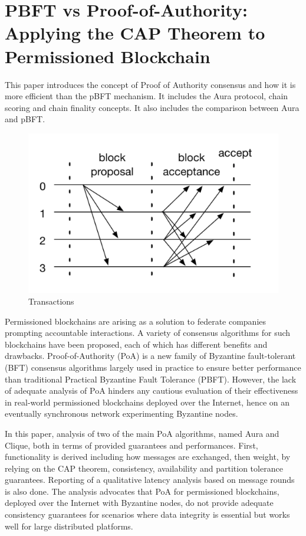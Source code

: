 \section { \textbf{PBFT vs Proof-of-Authority: Applying the CAP Theorem to Permissioned Blockchain}}
	      	      
	      This paper introduces the concept of Proof of Authority consensus and how it is more efficient than the pBFT mechanism. It includes the Aura protocol, chain scoring and chain finality concepts. It also includes the comparison between Aura and pBFT.
	\begin{figure}[!h]
	\centering
	\includegraphics[width=\linewidth]{Images/aura.png}
	\caption{Transactions}
\end{figure}	      	      
	      Permissioned blockchains are arising as a solution to federate companies prompting accountable interactions. A variety of consensus algorithms for such blockchains have been proposed, each of which has different benefits and drawbacks. Proof-of-Authority (PoA) is a new family of Byzantine fault-tolerant (BFT) consensus algorithms largely used in practice to ensure better performance than traditional Practical Byzantine Fault Tolerance (PBFT). However, the lack of adequate analysis of PoA hinders any cautious evaluation of their effectiveness in real-world permissioned blockchains deployed over the Internet, hence on an eventually synchronous network experimenting Byzantine nodes. 
	      
	      In this paper, analysis of two of the main PoA algorithms, named Aura and Clique, both in terms of provided guarantees and performances. First, functionality is derived including how messages are exchanged, then weight, by relying on the CAP theorem, consistency, availability and partition tolerance guarantees. Reporting of a qualitative latency analysis based on message rounds is also done. The analysis advocates that PoA for permissioned blockchains, deployed over the Internet with Byzantine nodes, do not provide adequate consistency guarantees for scenarios where data integrity is essential but works well for large distributed platforms.
	      
